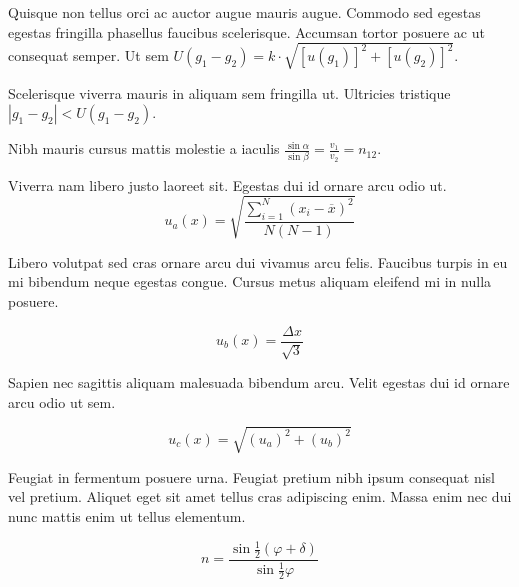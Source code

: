 \documentclass{article}
\begin{document}
Quisque non tellus orci ac auctor augue mauris augue. Commodo sed egestas egestas fringilla phasellus faucibus scelerisque. Accumsan tortor posuere ac ut consequat semper. Ut sem \begin{math}
	U(g_1-g_2)=k\cdot \sqrt{[u(g_1)]^2+[u(g_2)]^2}
\end{math}.\newline

Scelerisque viverra mauris in aliquam sem fringilla ut. Ultricies tristique $ |g_1-g_2|<U(g_1-g_2) $.\newline

Nibh mauris cursus mattis molestie a iaculis \( \frac{\sin \alpha}{\sin \beta}=\frac{v_1}{v_2}=n_{12} \).\newline

Viverra nam libero justo laoreet sit. Egestas dui id ornare arcu odio ut.
\[ u_a(x)=\sqrt{\frac{\sum_{i=1}^{N} (x_i-\overline{x})^2}{N(N-1)}} \]

Libero volutpat sed cras ornare arcu dui vivamus arcu felis. Faucibus turpis in eu mi bibendum neque egestas congue. Cursus metus aliquam eleifend mi in nulla posuere.

$$ u_b(x)=\frac{\Delta x}{\sqrt{3}} $$

Sapien nec sagittis aliquam malesuada bibendum arcu. Velit egestas dui id ornare arcu odio ut sem. 

\begin{displaymath}
	u_c(x)=\sqrt{(u_a)^2+(u_b)^2}
\end{displaymath}

Feugiat in fermentum posuere urna. Feugiat pretium nibh ipsum consequat nisl vel pretium. Aliquet eget sit amet tellus cras adipiscing enim. Massa enim nec dui nunc mattis enim ut tellus elementum.

\begin{equation}
	n=\frac{\sin \frac{1}{2}(\varphi +\delta)}{\sin \frac{1}{2}\varphi}
\end{equation}
\end{document}
